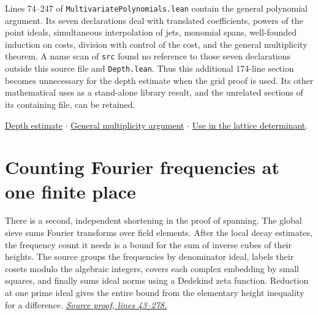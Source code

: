 \documentclass[11pt,letterpaper]{article}
\begin{document}
Lines 74--247 of \texttt{MultivariatePolynomials.lean} contain the general polynomial argument. Its seven declarations deal with translated coefficients, powers of the point ideals, simultaneous interpolation of jets, monomial spans, well-founded induction on costs, division with control of the cost, and the general multiplicity theorem. A name scan of \texttt{src} found no reference to those seven declarations outside this source file and \texttt{Depth.lean}. Thus this additional 174-line section becomes unnecessary for the depth estimate when the grid proof is used. Its other mathematical uses as a stand-alone library result, and the unrelated sections of its containing file, can be retained.
\par \href{https://github.com/VladimirReshetnikov/ProveIt/blob/8f274fb25a0be551cbb53ee802033689da108138/Analysis/GeneralizedRiemannHypothesis/Lean/grh/src/New/UpperBound/ElementaryDivisors/Depth.lean#L612-L665}{Depth estimate} $\cdot$ \href{https://github.com/VladimirReshetnikov/ProveIt/blob/8f274fb25a0be551cbb53ee802033689da108138/Analysis/GeneralizedRiemannHypothesis/Lean/grh/src/Lib/General/Algebra/MultivariatePolynomials.lean#L80-L247}{General multiplicity argument} $\cdot$ \href{https://github.com/VladimirReshetnikov/ProveIt/blob/8f274fb25a0be551cbb53ee802033689da108138/Analysis/GeneralizedRiemannHypothesis/Lean/grh/src/New/UpperBound/ElementaryDivisors/ElementaryDivisorTheorem.lean#L881-L910}{Use in the lattice determinant}.
\section{Counting Fourier frequencies at one finite place}
\label{sec:frequencyheight}

There is a second, independent shortening in the proof of spanning. The global sieve sums Fourier transforms over field elements. After the local decay estimates, the frequency count it needs is a bound for the sum of inverse cubes of their heights. The source groups the frequencies by denominator ideal, labels their cosets modulo the algebraic integers, covers each complex embedding by small squares, and finally sums ideal norms using a Dedekind zeta function. Reduction at one prime ideal gives the entire bound from the elementary height inequality for a difference.
\href{https://github.com/VladimirReshetnikov/ProveIt/blob/8f274fb25a0be551cbb53ee802033689da108138/Analysis/GeneralizedRiemannHypothesis/Lean/grh/src/New/Spanning/MainTerm/Frequencies.lean#L43-L278}{\textit{Source proof, lines 43--278.}}
\end{document}
